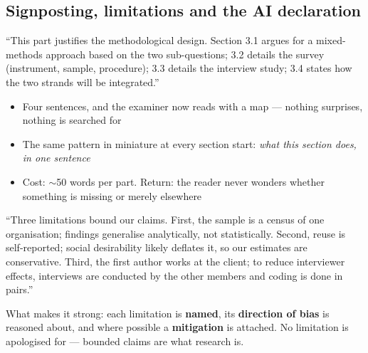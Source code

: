 \documentclass[11pt,a4paper,british,twoside=false,headings=small,chapterprefix=false,numbers=noenddot]{scrbook}
\newenvironment{block}[1]{\begin{tcolorbox}[scriptbox, title={#1}]}{\end{tcolorbox}}
\begin{document}
\subsection{Signposting, limitations and the AI declaration}
\begin{center}\small
\begin{block}{The first paragraph of Part III, as a working example}
    ``This part justifies the methodological design. Section 3.1 argues for
    a mixed-methods approach based on the two sub-questions; 3.2 details the
    survey (instrument, sample, procedure); 3.3 details the interview study;
    3.4 states how the two strands will be integrated.''
  \end{block}
  
  \begin{itemize}\setlength{\itemsep}{0.4em}
    \item Four sentences, and the examiner now reads with a map --- nothing
          surprises, nothing is searched for
    \item The same pattern in miniature at every section start: \emph{what
          this section does, in one sentence}
    \item Cost: $\sim$50 words per part. Return: the reader never wonders
          whether something is missing or merely elsewhere
  \end{itemize}
\end{center}

\begin{center}\small
\begin{block}{From a strong Part IV}
    ``Three limitations bound our claims. First, the sample is a census of
    one organisation; findings generalise analytically, not statistically.
    Second, reuse is self-reported; social desirability likely deflates it,
    so our estimates are conservative. Third, the first author works at the
    client; to reduce interviewer effects, interviews are conducted by the
    other members and coding is done in pairs.''
  \end{block}
  
  What makes it strong: each limitation is \textbf{named}, its
  \textbf{direction of bias} is reasoned about, and where possible a
  \textbf{mitigation} is attached. No limitation is apologised for ---
  bounded claims are what research is.
\end{center}
\end{document}

